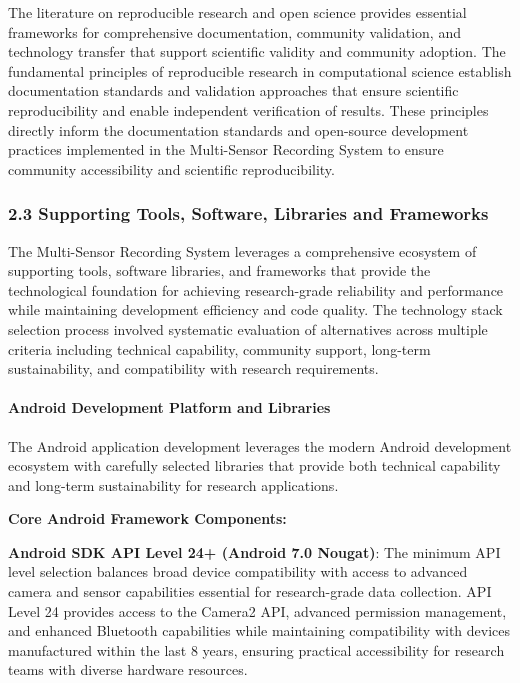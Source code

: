 \documentclass[12pt,a4paper]{report}
\begin{document}
The literature on reproducible research and open science provides essential frameworks for comprehensive documentation,
community validation, and technology transfer that support scientific validity and community adoption. The fundamental
principles of reproducible research in computational science establish documentation standards and validation approaches
that ensure scientific reproducibility and enable independent verification of results. These principles directly inform
the documentation standards and open-source development practices implemented in the Multi-Sensor Recording System to
ensure community accessibility and scientific reproducibility.

\subsubsection{2.3 Supporting Tools, Software, Libraries and Frameworks}

The Multi-Sensor Recording System leverages a comprehensive ecosystem of supporting tools, software libraries, and
frameworks that provide the technological foundation for achieving research-grade reliability and performance while
maintaining development efficiency and code quality. The technology stack selection process involved systematic
evaluation of alternatives across multiple criteria including technical capability, community support, long-term
sustainability, and compatibility with research requirements.

\paragraph{Android Development Platform and Libraries}

The Android application development leverages the modern Android development ecosystem with carefully selected libraries
that provide both technical capability and long-term sustainability for research applications.

\textbf{Core Android Framework Components:}

\textbf{Android SDK API Level 24+ (Android 7.0 Nougat)}: The minimum API level selection balances broad device compatibility
with access to advanced camera and sensor capabilities essential for research-grade data collection. API Level 24
provides access to the Camera2 API, advanced permission management, and enhanced Bluetooth capabilities while
maintaining compatibility with devices manufactured within the last 8 years, ensuring practical accessibility for
research teams with diverse hardware resources.
\end{document}
